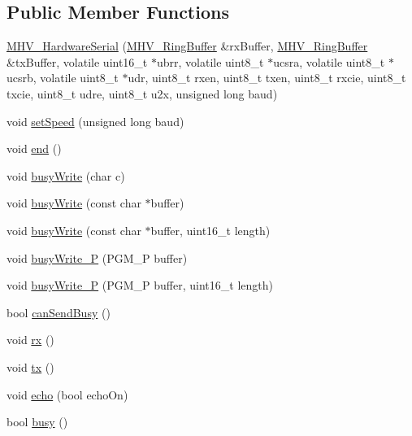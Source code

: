 \subsection*{\-Public \-Member \-Functions}
\begin{DoxyCompactItemize}
\item 
\hyperlink{class_m_h_v___hardware_serial_ad9d87e6449c9c1d29912ca6218b11931}{\-M\-H\-V\-\_\-\-Hardware\-Serial} (\hyperlink{class_m_h_v___ring_buffer}{\-M\-H\-V\-\_\-\-Ring\-Buffer} \&rx\-Buffer, \hyperlink{class_m_h_v___ring_buffer}{\-M\-H\-V\-\_\-\-Ring\-Buffer} \&tx\-Buffer, volatile uint16\-\_\-t $\ast$ubrr, volatile uint8\-\_\-t $\ast$ucsra, volatile uint8\-\_\-t $\ast$ucsrb, volatile uint8\-\_\-t $\ast$udr, uint8\-\_\-t rxen, uint8\-\_\-t txen, uint8\-\_\-t rxcie, uint8\-\_\-t txcie, uint8\-\_\-t udre, uint8\-\_\-t u2x, unsigned long baud)
\item 
void \hyperlink{class_m_h_v___hardware_serial_af8d170e311447db775b308a3ba882b91}{set\-Speed} (unsigned long baud)
\item 
void \hyperlink{class_m_h_v___hardware_serial_a1cc98a306711c95770df293def48dd9b}{end} ()
\item 
void \hyperlink{class_m_h_v___hardware_serial_aa4c2fa65afae88e4d3854a35955705ee}{busy\-Write} (char c)
\item 
void \hyperlink{class_m_h_v___hardware_serial_acc533901bc41d333e48a93b75bf9a15d}{busy\-Write} (const char $\ast$buffer)
\item 
void \hyperlink{class_m_h_v___hardware_serial_aca9542f5ed2b7ba04f5398fccf8da262}{busy\-Write} (const char $\ast$buffer, uint16\-\_\-t length)
\item 
void \hyperlink{class_m_h_v___hardware_serial_aef0e7d7d7866c39a1cd5d2ef8c9bdbd2}{busy\-Write\-\_\-\-P} (\-P\-G\-M\-\_\-\-P buffer)
\item 
void \hyperlink{class_m_h_v___hardware_serial_a6a2371b9509e27893a6c238fc9a046a8}{busy\-Write\-\_\-\-P} (\-P\-G\-M\-\_\-\-P buffer, uint16\-\_\-t length)
\item 
bool \hyperlink{class_m_h_v___hardware_serial_a650ce0799c3dbefb7170fc1875449e5a}{can\-Send\-Busy} ()
\item 
void \hyperlink{class_m_h_v___hardware_serial_aab993847fb6369e666495000d94196a3}{rx} ()
\item 
void \hyperlink{class_m_h_v___hardware_serial_a3674578dc6dce3ca7d32d6f3df9cd49f}{tx} ()
\item 
void \hyperlink{class_m_h_v___hardware_serial_a815b6e92f32457c55c2808701f315ff2}{echo} (bool echo\-On)
\item 
bool \hyperlink{class_m_h_v___hardware_serial_a8ea82d7e9d6958604ff94a55f331e9d5}{busy} ()
\end{DoxyCompactItemize}
